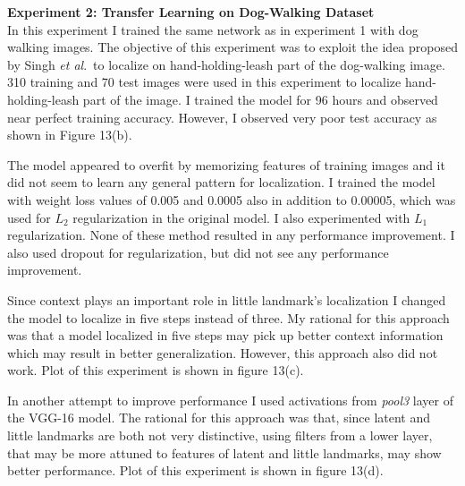 \documentclass [11pt,letterpaper ,twoside ,openany ]{report}
\begin{document}
    \noindent
    \textbf{Experiment 2: Transfer Learning on Dog-Walking Dataset}\\               
    In this experiment I trained the same network as in experiment 1 with dog walking images. The objective of this experiment was to exploit the idea proposed by Singh \textit{et al}.\ to localize on hand-holding-leash part of the dog-walking image. 310 training and 70 test images were used in this experiment to localize hand-holding-leash part of the image. I trained the model for 96 hours and observed near perfect training accuracy. However, I observed very poor test accuracy as shown in Figure 13(b).    

    The model appeared to overfit by memorizing features of training images and it did not seem to learn any general pattern for localization. I trained the model with weight loss values of 0.005 and 0.0005 also in addition to 0.00005, which was used for \(L_2\) regularization in the original model. I also experimented with \(L_1\) regularization. None of these method resulted in any performance improvement. I also used dropout \cite{srivastava2014dropout} for regularization, but did not see any performance improvement.

    Since context plays an important role in little landmark's localization I changed the model to localize in five steps instead of three. My rational for this approach was that a model localized in five steps may pick up better context information which may result in better generalization. However, this approach also did not work. Plot of this experiment is shown in figure 13(c).

    In another attempt to improve performance I used activations from \textit{pool3} layer of the VGG-16 model. The rational for this approach was that, since latent and little landmarks are both not very distinctive, using filters from a lower layer, that may be more attuned to features of latent and little landmarks, may show better performance. Plot of this experiment is shown in figure 13(d).\\
\end{document}
